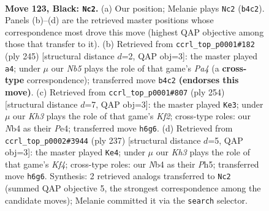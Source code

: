 \documentclass[11pt]{article}
\begin{document}
\clearpage

\begin{figure}[p]\centering
\begin{subfigure}{0.46\textwidth}\centering
\resizebox{\linewidth}{!}{%
\newchessgame
\chessboard[
  setfen={8/8/7k/6p1/1n6/8/4B2K/8 b - - 4 123},
  showmover=false,
  pgfstyle=straightmove, color=movearrow, markmove={b4-c2}
]}
\caption{}
\end{subfigure}\hfill
\begin{subfigure}{0.46\textwidth}\centering
\resizebox{\linewidth}{!}{%
\newchessgame
\chessboard[
  setfen={8/8/7K/p7/8/k7/1p6/1B6 b - - 3 123},
  showmover=false,
  pgfstyle=straightmove, color=movearrow, markmove={a5-a4}
]}
\caption{}
\end{subfigure}
\\[4pt]
\begin{subfigure}{0.46\textwidth}\centering
\resizebox{\linewidth}{!}{%
\newchessgame
\chessboard[
  setfen={8/3b1k2/8/8/4P3/5P2/3B1K2/8 w - - 79 128},
  showmover=false,
  pgfstyle=straightmove, color=movearrow, markmove={f2-e3}
]}
\caption{}
\end{subfigure}\hfill
\begin{subfigure}{0.46\textwidth}\centering
\resizebox{\linewidth}{!}{%
\newchessgame
\chessboard[
  setfen={8/1b6/8/5k1p/5p1B/8/8/6K1 b - - 85 119},
  showmover=false,
  pgfstyle=straightmove, color=movearrow, markmove={f5-e4}
]}
\caption{}
\end{subfigure}
\caption{\textbf{Move 123, Black: \texttt{Nc2}.} (a) Our position; Melanie plays \texttt{Nc2} (\texttt{b4c2}). Panels (b)--(d) are the retrieved master positions whose correspondence most drove this move (highest QAP objective among those that transfer to it). (b) Retrieved from \texttt{ccrl\_top\_p0001\#182} (ply 245) [structural distance $d$=2, QAP obj=3]: the master played \texttt{a4}; under $\mu$ our \emph{Nb5} plays the role of that game's \emph{Pa4} (a \textbf{cross-type} correspondence); transferred move \texttt{b4c2} \textbf{(endorses this move)}. (c) Retrieved from \texttt{ccrl\_top\_p0001\#807} (ply 254) [structural distance $d$=7, QAP obj=3]: the master played \texttt{Ke3}; under $\mu$ our \emph{Kh3} plays the role of that game's \emph{Kf2}; cross-type roles: our \emph{N}b4 as their \emph{P}e4; transferred move \texttt{h6g6}. (d) Retrieved from \texttt{ccrl\_top\_p0002\#3944} (ply 237) [structural distance $d$=5, QAP obj=3]: the master played \texttt{Ke4}; under $\mu$ our \emph{Kh3} plays the role of that game's \emph{Kf4}; cross-type roles: our \emph{N}b4 as their \emph{P}h5; transferred move \texttt{h6g6}. Synthesis: 2 retrieved analogs transferred to \texttt{Nc2} (summed QAP objective 5, the strongest correspondence among the candidate moves); Melanie committed it via the \texttt{search} selector.}
\label{fig:thought-m245}
\end{figure}
\end{document}
